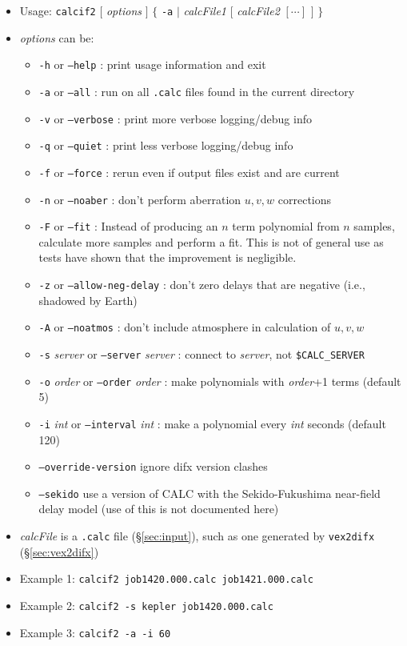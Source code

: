 \begin{itemize}
\item[] Usage: {\tt calcif2} $[$ {\em options} $]$ $\{$ {\tt -a} $\mid$ {\em calcFile1} $[$ {\em calcFile2} $[\cdots]$ $]$ $\}$
\item[] {\em options} can be:
\begin{itemize}
\item[] {\tt -h} or {\tt --help} : print usage information and exit
\item[] {\tt -a} or {\tt --all} : run on all {\tt .calc} files found in the current directory
\item[] {\tt -v} or {\tt --verbose} : print more verbose logging/debug info
\item[] {\tt -q} or {\tt --quiet} : print less verbose logging/debug info
\item[] {\tt -f} or {\tt --force} : rerun even if output files exist and are current
\item[] {\tt -n} or {\tt --noaber} : don't perform aberration $u,v,w$ corrections
\item[] {\tt -F} or {\tt --fit} : Instead of producing an $n$ term polynomial from $n$ samples, calculate more samples and perform a fit.  This is not of general use as tests have shown that the improvement is negligible.
\item[] {\tt -z} or {\tt --allow-neg-delay} : don't zero delays that are negative (i.e., shadowed by Earth)
\item[] {\tt -A} or {\tt --noatmos} : don't include atmosphere in calculation of $u,v,w$
\item[] {\tt -s} {\em server} or {\tt --server} {\em server} : connect to {\em server}, not {\tt \$CALC\_SERVER}
\item[] {\tt -o} {\em order} or {\tt --order} {\em order} : make polynomials with {\em order}+1 terms (default 5)  
\item[] {\tt -i} {\em int} or {\tt --interval} {\em int} : make a polynomial every {\em int} seconds (default 120)
\item[] {\tt --override-version} ignore difx version clashes
\item[] {\tt --sekido} use a version of CALC with the Sekido-Fukushima near-field delay model (use of this is not documented here)
\end{itemize}
\item[] {\em calcFile} is a {\tt .calc} file (\S\ref{sec:input}), such as one generated by {\tt vex2difx} (\S\ref{sec:vex2difx})
\item[] Example 1: {\tt calcif2 job1420.000.calc job1421.000.calc} 
\item[] Example 2: {\tt calcif2 -s kepler job1420.000.calc}
\item[] Example 3: {\tt calcif2 -a -i 60} 
\end{itemize}

